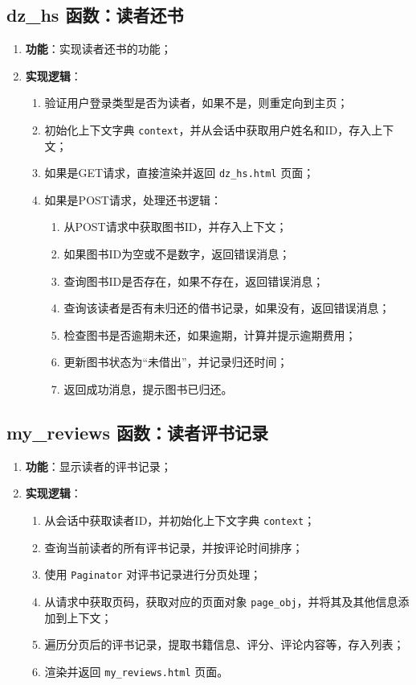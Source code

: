 \documentclass{ctexart}
\begin{document}
\subsection{dz\_hs 函数：读者还书}
\begin{enumerate}
    \item \textbf{功能}：实现读者还书的功能；
    \item \textbf{实现逻辑}：
    \begin{enumerate}
        \item 验证用户登录类型是否为读者，如果不是，则重定向到主页；
        \item 初始化上下文字典 \texttt{context}，并从会话中获取用户姓名和ID，存入上下文；
        \item 如果是GET请求，直接渲染并返回 \texttt{dz\_hs.html} 页面；
        \item 如果是POST请求，处理还书逻辑：
        \begin{enumerate}
            \item 从POST请求中获取图书ID，并存入上下文；
            \item 如果图书ID为空或不是数字，返回错误消息；
            \item 查询图书ID是否存在，如果不存在，返回错误消息；
            \item 查询该读者是否有未归还的借书记录，如果没有，返回错误消息；
            \item 检查图书是否逾期未还，如果逾期，计算并提示逾期费用；
            \item 更新图书状态为“未借出”，并记录归还时间；
            \item 返回成功消息，提示图书已归还。
        \end{enumerate}
    \end{enumerate}
\end{enumerate}

\subsection{my\_reviews 函数：读者评书记录}
\begin{enumerate}
    \item \textbf{功能}：显示读者的评书记录；
    \item \textbf{实现逻辑}：
    \begin{enumerate}
        \item 从会话中获取读者ID，并初始化上下文字典 \texttt{context}；
        \item 查询当前读者的所有评书记录，并按评论时间排序；
        \item 使用 \texttt{Paginator} 对评书记录进行分页处理；
        \item 从请求中获取页码，获取对应的页面对象 \texttt{page\_obj}，并将其及其他信息添加到上下文；
        \item 遍历分页后的评书记录，提取书籍信息、评分、评论内容等，存入列表；
        \item 渲染并返回 \texttt{my\_reviews.html} 页面。
    \end{enumerate}
\end{enumerate}
\end{document}
